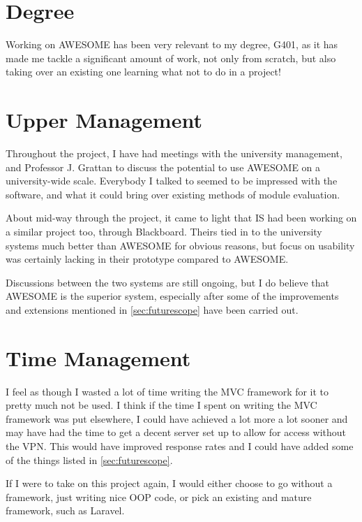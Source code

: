 	\section{Degree}
	
	Working on \ac{AWESOME} has been very relevant to my degree, G401, as it has made me tackle a significant amount of work, not only from scratch, but also taking over an existing one learning what not to do in a project!
	
	\section{Upper Management}
	
	Throughout the project, I have had meetings with the university management, and Professor J. Grattan to discuss the potential to use \ac{AWESOME} on a university-wide scale.
	Everybody I talked to seemed to be impressed with the software, and what it could bring over existing methods of module evaluation.
	
	About mid-way through the project, it came to light that \ac{IS} had been working on a similar project too, through Blackboard.
	Theirs tied in to the university systems much better than \ac{AWESOME} for obvious reasons, but focus on usability was certainly lacking in their prototype compared to \ac{AWESOME}.
	
	Discussions between the two systems are still ongoing, but I do believe that \ac{AWESOME} is the superior system, especially after some of the improvements and extensions mentioned in \autoref{sec:futurescope} have been carried out.
	
	\section{Time Management}
	
	I feel as though I wasted a lot of time writing the \ac{MVC} framework for it to pretty much not be used. I think if the time I spent on writing the \ac{MVC} framework was put elsewhere, I could have achieved a lot more a lot sooner and may have had the time to get a decent server set up to allow for access without the \ac{VPN}.
	This would have improved response rates and I could have added some of the things listed in \autoref{sec:futurescope}.
	
	If I were to take on this project again, I would either choose to go without a framework, just writing nice \ac{OOP} code, or pick an existing and mature framework, such as Laravel.
	
